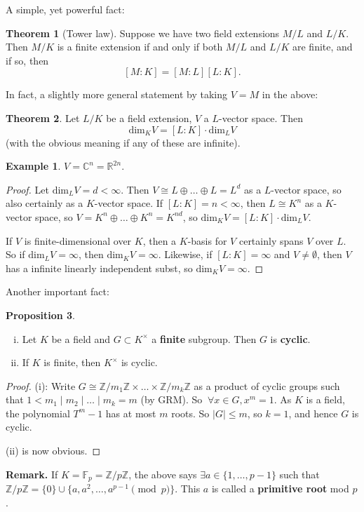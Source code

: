 \documentclass{article}
\theoremstyle{definition}
\newtheorem{theorem}{Theorem}[section]
\newtheorem{prop}[theorem]{Proposition}
\newtheorem{example}{Example}[section]
\begin{document}
A simple, yet powerful fact:
\begin{theorem}[Tower law]
    Suppose we have two field extensions $M/L$ and $L/K$. Then $M/K$ is a finite extension if and only if both $M/L$ and $L/K$ are finite, and if so, then \[
    [M : K] = [M : L][L : K].
    \]
\end{theorem}
In fact, a slightly more general statement by taking $V=M$ in the above:
\begin{theorem}
    Let $L/K$ be a field extension, $V$ a $L$-vector space. Then $$\text{dim}_K V = [L : K] \cdot \text{dim}_L V$$
    (with the obvious meaning if any of these are infinite).
\end{theorem}
\begin{example}
    $V = \mathbb{C}^{n}= \mathbb{R}^{2n}$.
\end{example}
\begin{proof}
    Let $\text{dim}_L V = d < \infty$. Then $V \cong L \oplus \ldots \oplus L = L^d$ as a $L$-vector space, so also certainly as a $K$-vector space. If $[L:K] = n < \infty$, then $L \cong K^n$ as a $K$-vector space, so $V = K^n \oplus \ldots \oplus K^n = K^{nd}$, so $\text{dim}_K V = [L : K] \cdot \text{dim}_L V$.
    \vspace{1mm}
    
    If $V$ is finite-dimensional over $K$, then a $K$-basis for $V$ certainly spans $V$ over $L$. So if $\text{dim}_L V = \infty$, then $\text{dim}_K V = \infty$. Likewise, if $[L:K] = \infty$ and $V \neq \emptyset$, then $V$ has a infinite linearly independent subst, so $\text{dim}_K V = \infty$.
\end{proof}
Another important fact:
\begin{prop}
    \begin{enumerate}[(i)]
        \item Let $K$ be a field and $G \subset K^\times$ a \textbf{finite} subgroup. Then $G$ is \textbf{cyclic}.
        \item If $K$ is finite, then $K^{\times}$ is cyclic.
    \end{enumerate}
\end{prop}
\begin{proof}
    (i): Write $G \cong \mathbb{Z}/m_1\mathbb{Z} \times \ldots \times \mathbb{Z}/m_k\mathbb{Z}$ as a product of cyclic groups such that $1<m_1 \mid m_2\mid \ldots\mid m_k = m$ (by GRM). So $~\forall x \in G, x^m = 1$. As $K$ is a field, the polynomial $T^m-1$ has at most $m$ roots. So $|G|\le m$, so $k=1$, and hence $G$ is cyclic.

    (ii) is now obvious.
\end{proof}
\textbf{Remark.} If $K=\mathbb{F}_p = \mathbb{Z}/p\mathbb{Z}$, the above says $\exists a \in \{1,\ldots,p-1\}$ such that $\mathbb{Z}/p\mathbb{Z} = \{0\} \cup \{a,a^2,\ldots,a^{p-1} \pmod{p}\}$. This $a$ is called a \textbf{primitive root} mod $p$. 
\end{document}
